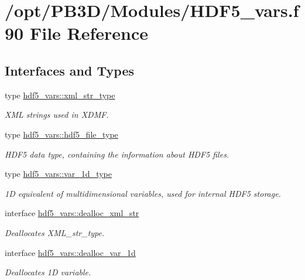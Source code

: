\hypertarget{HDF5__vars_8f90}{}\section{/opt/\+P\+B3\+D/\+Modules/\+H\+D\+F5\+\_\+vars.f90 File Reference}
\label{HDF5__vars_8f90}
\subsection*{Interfaces and Types}
\begin{DoxyCompactItemize}
\item 
type \hyperlink{structhdf5__vars_1_1xml__str__type}{hdf5\+\_\+vars\+::xml\+\_\+str\+\_\+type}
\begin{DoxyCompactList}\small\item\em X\+ML strings used in X\+D\+MF. \end{DoxyCompactList}\item 
type \hyperlink{structhdf5__vars_1_1hdf5__file__type}{hdf5\+\_\+vars\+::hdf5\+\_\+file\+\_\+type}
\begin{DoxyCompactList}\small\item\em H\+D\+F5 data type, containing the information about H\+D\+F5 files. \end{DoxyCompactList}\item 
type \hyperlink{structhdf5__vars_1_1var__1d__type}{hdf5\+\_\+vars\+::var\+\_\+1d\+\_\+type}
\begin{DoxyCompactList}\small\item\em 1D equivalent of multidimensional variables, used for internal H\+D\+F5 storage. \end{DoxyCompactList}\item 
interface \hyperlink{interfacehdf5__vars_1_1dealloc__xml__str}{hdf5\+\_\+vars\+::dealloc\+\_\+xml\+\_\+str}
\begin{DoxyCompactList}\small\item\em Deallocates X\+M\+L\+\_\+str\+\_\+type. \end{DoxyCompactList}\item 
interface \hyperlink{interfacehdf5__vars_1_1dealloc__var__1d}{hdf5\+\_\+vars\+::dealloc\+\_\+var\+\_\+1d}
\begin{DoxyCompactList}\small\item\em Deallocates 1D variable. \end{DoxyCompactList}\end{DoxyCompactItemize}
